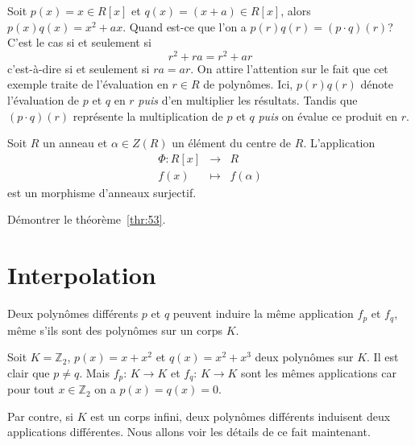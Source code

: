 \begin{example}
  \label{exe:43}
  Soit $p(x) = x ∈ R[x]$ et $q(x) = (x + a) ∈ R[x]$, alors $p(x) q(x) = x^2 + ax$. Quand est-ce que l'on a $p(r) q(r) = (p ⋅q)(r)$? C'est le cas si et seulement si
  \begin{displaymath}
     r^2 + r a = r^2 + a r  
   \end{displaymath}
   c'est-à-dire si et seulement si $ra = ar$. 
   On attire l'attention sur le fait que cet exemple traite de l'évaluation en $r \in R$ de polynômes. 
   Ici, $p(r)q(r)$ dénote l'évaluation de $p$ et $q$ en $r$ \emph{puis} d'en multiplier les résultats.
   Tandis que $(p⋅q)(r)$ représente la multiplication de $p$ et $q$ \emph{puis} on évalue ce produit en $r$.
\end{example}


\begin{theorem}
  \label{thr:53}
  Soit $R$ un anneau et $\alpha \in Z(R)$ un élément du centre de $R$. L'application 
  \begin{displaymath}   
    \begin{array}{rcl}
    \Phi \colon R[x] &\rightarrow & R \\
           f(x) &\mapsto &f(\alpha)          
    \end{array}
  \end{displaymath}
est un morphisme d'anneaux surjectif. 
\end{theorem}


\begin{exercise}
  \label{exe:44}
  Démontrer le théorème~\ref{thr:53}. 
\end{exercise}


\section{Interpolation}
\label{sec:interpolation}


Deux polynômes différents $p$ et $q$ peuvent induire la même application $f_p$ et $f_q$, même s'ils sont des polynômes sur un corps $K$.

\begin{example}
  \label{exe:36}
  Soit $K = ℤ_2$, $p(x) = x + x^2 $ et $q(x) = x^2 + x^3$ deux
  polynômes sur $K$. Il est clair que $p ≠ q$. Mais $f_p:\, K →K$ et
  $f_q:\, K →K$ sont les mêmes applications car pour tout
  $x ∈ℤ_2$ on a $p(x) = q(x) = 0$.
\end{example}

Par contre, si $K$ est un corps infini, deux polynômes différents induisent deux applications différentes. Nous allons voir les détails de ce fait maintenant.

